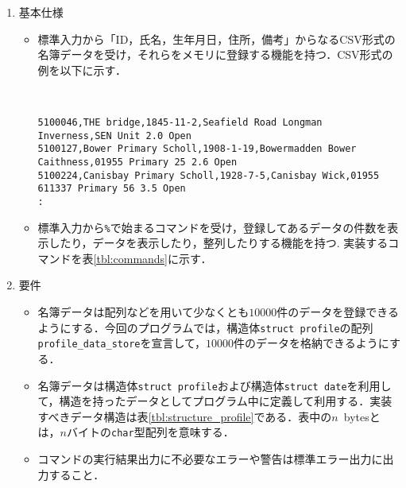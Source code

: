 \documentclass[a4j,11pt]{jarticle}
\begin{document}
\begin{enumerate}
\setlength{\parskip}{0mm}\setlength{\itemsep}{0mm}
\item 基本仕様
\begin{itemize}
    \item 標準入力から「ID，氏名，生年月日，住所，備考」からなるCSV形式の名簿データを受け，それらをメモリに登録する機能を持つ．CSV形式の例を以下に示す．
{\fontsize{8pt}{11pt} \selectfont
　\begin{verbatim}
5100046,THE bridge,1845-11-2,Seafield Road Longman Inverness,SEN Unit 2.0 Open
5100127,Bower Primary Scholl,1908-1-19,Bowermadden Bower Caithness,01955 Primary 25 2.6 Open
5100224,Canisbay Primary Scholl,1928-7-5,Canisbay Wick,01955 611337 Primary 56 3.5 Open
:
  \end{verbatim}
}
\item 標準入力から\verb|%|で始まるコマンドを受け，登録してあるデータの件数を表示したり，データを表示したり，整列したりする機能を持つ.
実装するコマンドを表\ref{tbl:commands}に示す．
\end{itemize}

\item 要件
\begin{itemize}
    \item 名簿データは配列などを用いて少なくとも$10000$件のデータを登録できるようにする．今回のプログラムでは，構造体\verb|struct profile|の配列\verb|profile_data_store|を宣言して，$10000$件のデータを格納できるようにする．

    \item 名簿データは構造体\verb|struct profile|および構造体\verb|struct date|を利用して，構造を持ったデータとしてプログラム中に定義して利用する．実装すべきデータ構造は表\ref{tbl:structure_profile}である．表中の$n$~bytesとは，$n$バイトの\verb|char|型配列を意味する．
    \item コマンドの実行結果出力に不必要なエラーや警告は標準エラー出力に出力すること．
\end{itemize}


\end{enumerate}
\end{document}

